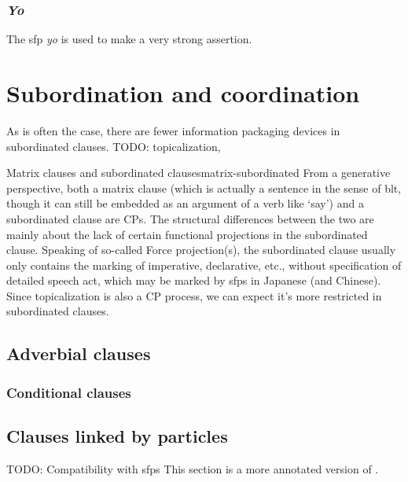 \documentclass[UTF8, a4paper, oneside, scheme=plain]{ctexrep}
\newcommand*{\citesec}[1]{\S~{#1}}
\newcommand{\corpus}[1]{\emph{#1}}
\newcommand{\translate}[1]{`#1'}
\begin{document}
\subsection{\corpus{Yo}}

The \ac{sfp} \corpus{yo} is used to make a very strong assertion.

\chapter{Subordination and coordination}

As is often the case, there are fewer information packaging devices in subordinated clauses.
TODO: topicalization, 

\begin{theorybox}{Matrix clauses and subordinated clauses}{matrix-subordinated}
    From a generative perspective, both a matrix clause 
    (which is actually a sentence in the sense of \acs{blt}, 
    though it can still be embedded as an argument of a verb like \translate{say})
    and a subordinated clause are CPs.
    The structural differences between the two 
    are mainly about the lack of certain functional projections in the subordinated clause.
    Speaking of so-called Force projection(s),
    the subordinated clause usually only contains the marking of 
    imperative, declarative, etc.,
    without specification of detailed speech act,
    which may be marked by \ac{sfp}s in Japanese (and Chinese).
    Since topicalization is also a CP process,
    we can expect it's more restricted in subordinated clauses.
\end{theorybox}

\section{Adverbial clauses}

\subsection{Conditional clauses}

\section{Clauses linked by particles}\label{sec:particle-linking-clause}

TODO: Compatibility with \ac{sfp}s
This section is a more annotated version of \citet[\citesec{6.3}]{akiyama2012japanese}.
\end{document}
